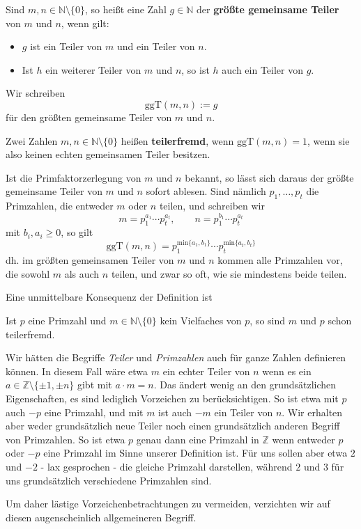 \begin{definition} Sind $m,n \in \mathbb N \setminus \{0 \}$, so heißt eine Zahl $g \in \mathbb N$ der 
\textbf{größte gemeinsame Teiler} von $m$ und $n$, wenn gilt:
\begin{itemize}
\item $g$ ist ein Teiler von $m$ und ein Teiler von $n$.
\item Ist $h$ ein weiterer Teiler von $m$ und $n$, so ist $h$ auch ein Teiler von $g$.
\end{itemize}
Wir schreiben 
	$$ \mathrm{ggT}(m,n) := g $$ 
für den größten gemeinsame Teiler von $m$ und $n$.

Zwei Zahlen $m,n \in \mathbb N \setminus \{0 \}$ heißen \textbf{teilerfremd}, wenn 
$\textrm{ggT}(m,n) = 1$, wenn sie also keinen echten gemeinsamen Teiler besitzen.
\end{definition}

\begin{notiz}
Ist die Primfaktorzerlegung von $m$ und $n$ bekannt, so lässt sich daraus der größte gemeinsame Teiler von 
$m$ und $n$ sofort ablesen. Sind nämlich $p_1, \ldots, p_t$ die Primzahlen, die entweder $m$ oder $n$ teilen, und 
schreiben wir 
	$$ m = p_1^{a_1} \cdots p_t^{a_t}, \qquad n = p_1^{b_1} \cdots p_t^{a_t} $$
mit $b_i, a_i \geq 0$, so gilt 
	$$ \mathrm{ggT}(m,n) = p_1^{\mathrm{min}\{ a_1, b_1\}} \cdots p_t^{\mathrm{min}\{ a_t, b_t\}} $$
dh. im größten gemeinsamen Teiler von $m$ und $n$ kommen alle Primzahlen vor, die sowohl $m$ als auch $n$ 
teilen, und zwar so oft, wie sie mindestens beide teilen. 
\end{notiz}

Eine unmittelbare Konsequenz der Definition ist

\begin{satz}\label{gruppe_prim_teilerfremd} 
Ist $p$ eine Primzahl und $m \in \mathbb N \setminus \{0 \}$ kein Vielfaches von $p$, so 
sind $m$ und $p$ schon teilerfremd.
\end{satz}


\medbreak

\begin{notiz} Wir hätten die Begriffe \textit{Teiler} und \textit{Primzahlen} auch für ganze Zahlen 
definieren können. In diesem Fall wäre etwa $m$ ein echter Teiler von $n$ wenn es ein $a \in \mathbb Z 
\setminus \{\pm 1, \pm n\}$ gibt mit $a \cdot m = n$. 
Das ändert wenig an den grundsätzlichen Eigenschaften, es sind lediglich Vorzeichen 
zu berücksichtigen. So ist etwa mit $p$ auch $-p$ eine Primzahl, und mit $m$ ist auch $-m$ ein Teiler von 
$n$. Wir erhalten aber weder grundsätzlich neue Teiler noch einen grundsätzlich anderen Begriff von 
Primzahlen. So ist etwa $p$ genau dann eine Primzahl in $\mathbb Z$ wenn entweder $p$ oder $-p$ eine Primzahl 
im Sinne unserer Definition ist. Für uns sollen aber etwa $2$ und $-2$ - lax gesprochen - die gleiche Primzahl 
darstellen, während $2$ und $3$ für uns grundsätzlich verschiedene Primzahlen sind. 

Um daher lästige Vorzeichenbetrachtungen zu vermeiden, verzichten wir auf diesen 
augenscheinlich allgemeineren Begriff. 
\end{notiz}

